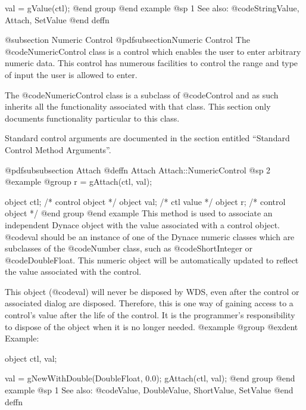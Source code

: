 val = gValue(ctl);
@end group
@end example
@sp 1
See also:  @code{StringValue, Attach, SetValue}
@end deffn








@subsection Numeric Control
@pdfsubsection{Numeric Control}
The @code{NumericControl} class is a control which enables the user to
enter arbitrary numeric data.  This control has numerous facilities to
control the range and type of input the user is allowed to enter.

The @code{NumericControl} class is a subclass of @code{Control} and as such
inherits all the functionality associated with that class.  This section
only documents functionality particular to this class.

Standard control arguments are documented in the section entitled
``Standard Control Method Arguments''.












@pdfsubsubsection {Attach}
@deffn {Attach} Attach::NumericControl
@sp 2
@example
@group
r = gAttach(ctl, val);

object  ctl;   /*  control object  */
object  val;   /*  ctl value       */
object  r;     /*  control object  */
@end group
@end example
This method is used to associate an independent Dynace object with the
value associated with a control object.  @code{val} should be an
instance of one of the Dynace numeric classes which are subclasses of
the @code{Number} class, such as @code{ShortInteger} or
@code{DoubleFloat}.  This numeric object will be automatically updated
to reflect the value associated with the control.

This object (@code{val}) will never be disposed by WDS, even after
the control or associated dialog are disposed.  Therefore, this
is one way of gaining access to a control's value after the life
of the control.  It is the programmer's responsibility to dispose of
the object when it is no longer needed.
@example
@group
@exdent Example:

object  ctl, val;

val = gNewWithDouble(DoubleFloat, 0.0);
gAttach(ctl, val);
@end group
@end example
@sp 1
See also:  @code{Value, DoubleValue, ShortValue, SetValue}
@end deffn












